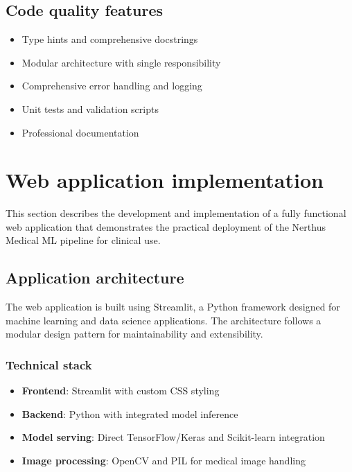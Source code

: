 \documentclass[11pt]{article}
\begin{document}
\subsection{Code quality features}
\begin{itemize}
    \item Type hints and comprehensive docstrings
    \item Modular architecture with single responsibility
    \item Comprehensive error handling and logging
    \item Unit tests and validation scripts
    \item Professional documentation
\end{itemize}


























\section{Web application implementation}
\label{sec:web_application}

This section describes the development and implementation of a fully functional web application that demonstrates the practical deployment of the Nerthus Medical ML pipeline for clinical use.

\subsection{Application architecture}

The web application is built using Streamlit, a Python framework designed for machine learning and data science applications. The architecture follows a modular design pattern for maintainability and extensibility.

\subsubsection{Technical stack}
\begin{itemize}
    \item \textbf{Frontend}: Streamlit with custom CSS styling
    \item \textbf{Backend}: Python with integrated model inference
    \item \textbf{Model serving}: Direct TensorFlow/Keras and Scikit-learn integration
    \item \textbf{Image processing}: OpenCV and PIL for medical image handling
\end{itemize}
\end{document}
